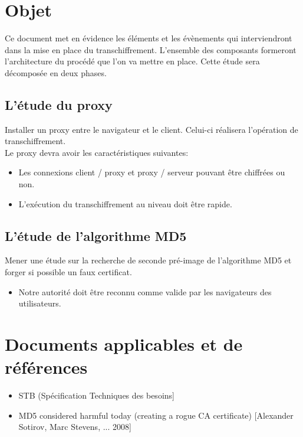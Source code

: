 \documentclass[a4paper,11pt,french]{article}
\begin{document}
\section{Objet}

Ce document met en évidence les éléments et les évènements qui interviendront dans la mise en place du transchiffrement. L'ensemble des composants formeront l'architecture du procédé que l'on va mettre en place. Cette étude sera décomposée en deux phases.  
\subsection{L'étude du proxy}
Installer un proxy entre le navigateur et le client. Celui-ci réalisera l'opération de transchiffrement.  \\
Le proxy devra avoir les caractéristiques suivantes:
\begin{itemize}
\item Les connexions client / proxy et proxy / serveur pouvant être  chiffrées ou non.
\item L'exécution du transchiffrement au niveau doit être rapide.
\end{itemize}

\subsection{L'étude de l'algorithme MD5}
Mener une étude sur la recherche de seconde pré-image de l'algorithme MD5 et forger si possible un faux certificat.  \\ 
\begin{itemize}
\item Notre autorité doit être reconnu comme valide par les navigateurs des utilisateurs.
\end{itemize}
\section{Documents applicables et de références}
\begin{itemize}
\item STB (Spécification Techniques des besoins]
\item MD5 considered harmful today (creating a rogue CA certificate) [Alexander Sotirov, Marc Stevens, ... 2008]
\end{itemize}
\end{document}
